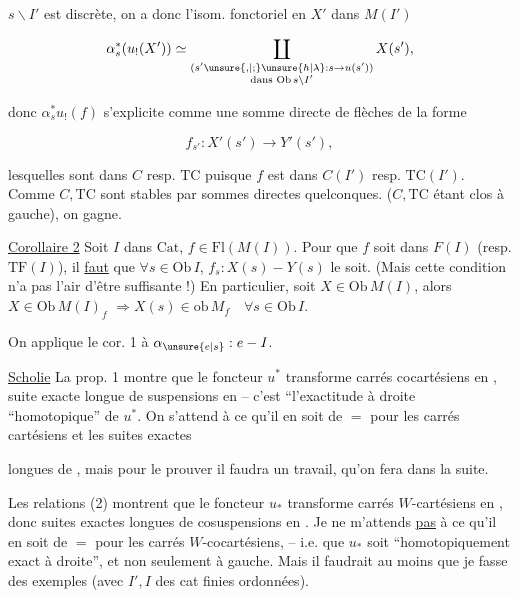  $s\backslash I'$ est discrète, on a donc l'isom. fonctoriel en $X'$ dans $M(I')$

\[ \alpha_s^*(u_!(X'))\simeq\coprod_{\substack{(s'\unsure{,|;}\unsure{h|\lambda}:s\to u(s'))\\\text{dans }\mathrm{Ob}\,s\backslash I'}}X(s'), \]

 donc  $\alpha_s^*u_!(f)$ s'explicite comme une somme directe  de flèches de la forme

\[ f_{s'}:X'(s')\longrightarrow Y'(s'), \]

lesquelles sont dans $C$ resp. $\mathrm{TC}$ puisque $f$ est dans $C(I')$ resp. $\mathrm{TC}(I')$. Comme $C,\mathrm{TC}$ sont stables par sommes directes quelconques. ($C,\mathrm{TC}$ étant clos à gauche), on gagne.

\uline{Corollaire 2} Soit $I$ dans $\mathrm{Cat}$,  $f\in\mathrm{Fl}(M(I))$. Pour que $f$ soit dans $F(I)$ (resp.  $\mathrm{TF}(I)$), il \uline{faut} que $\forall s\in\mathrm{Ob}\,I$, $f_s:X(s)-Y(s)$ le soit. (Mais cette condition n'a pas   l'air d'être suffisante !) En particulier, soit $X\in\mathrm{Ob}\,M(I)$, alors $X\in\mathrm{Ob}\,M(I)_f$ $\Longrightarrow X(s)\in\mathrm{ob}\,M_f\quad\forall s\in\mathrm{Ob}\,I$.

On applique le cor. 1 à $\alpha_{\unsure{e|s}}:e-I$.

\uline{Scholie} La prop. 1  montre que le foncteur $u^*$ transforme carrés cocartésiens en , suite exacte longue de suspensions en  -- c'est ``l'exactitude à droite ``homotopique'' de $u^*$. On s'attend à ce qu'il en soit de $=$ pour les carrés cartésiens et les suites exactes

longues de , mais pour le prouver il faudra un travail, qu'on fera dans la suite.

Les relations (2) montrent que le foncteur $u_*$ transforme carrés $W$-cartésiens en , donc suites exactes longues de cosuspensions en . Je ne m'attends \uline{pas} à ce qu'il en soit de $=$  pour les carrés $W$-cocartésiens, -- i.e. que $u_*$ soit ``homotopiquement exact à droite'', et non seulement à gauche. Mais il faudrait au moins que je fasse des exemples (avec $I',I$ des cat finies ordonnées).

